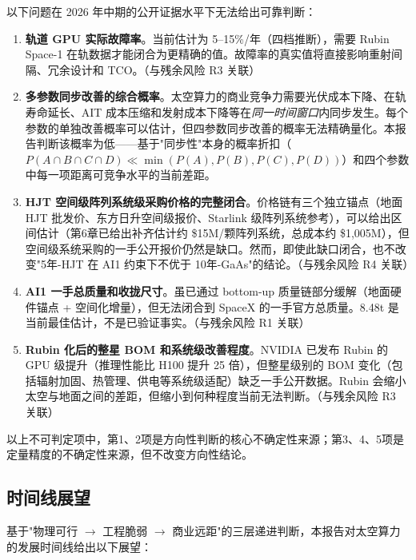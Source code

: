 以下问题在 2026 年中期的公开证据水平下无法给出可靠判断：

\begin{enumerate}[leftmargin=*]
    \item \textbf{轨道 GPU 实际故障率}。当前估计为 5--15\%/年（四档推断），需要 Rubin Space-1 在轨数据才能闭合为更精确的值。故障率的真实值将直接影响重射间隔、冗余设计和 TCO。（与残余风险 R3 关联）

    \item \textbf{多参数同步改善的综合概率}。太空算力的商业竞争力需要光伏成本下降、在轨寿命延长、AIT 成本压缩和发射成本下降等在\emph{同一时间窗口}内同步发生。每个参数的单独改善概率可以估计，但四参数同步改善的概率无法精确量化。本报告判断该概率为低——基于"同步性"本身的概率折扣（$P(A \cap B \cap C \cap D) \ll \min(P(A), P(B), P(C), P(D))$）和四个参数中每一项距离可竞争水平的当前差距。

    \item \textbf{HJT 空间级阵列系统级采购价格的完整闭合}。价格链有三个独立锚点（地面 HJT 批发价、东方日升空间级报价、Starlink 级阵列系统参考），可以给出区间估计（第6章已给出补齐估计约 \$15M/颗阵列系统，总成本约 \$1,005M），但空间级系统采购的一手公开报价仍然是缺口。然而，即使此缺口闭合，也不改变"5年-HJT 在 AI1 约束下不优于 10年-GaAs"的结论。（与残余风险 R4 关联）

    \item \textbf{AI1 一手总质量和收拢尺寸}。虽已通过 bottom-up 质量链部分缓解（地面硬件锚点 + 空间化增量），但无法闭合到 SpaceX 的一手官方总质量。8.48\;t 是当前最佳估计，不是已验证事实。（与残余风险 R1 关联）

    \item \textbf{Rubin 化后的整星 BOM 和系统级改善程度}。NVIDIA 已发布 Rubin 的 GPU 级提升（推理性能比 H100 提升 25 倍），但整星级别的 BOM 变化（包括辐射加固、热管理、供电等系统级适配）缺乏一手公开数据。Rubin 会缩小太空与地面之间的差距，但缩小到何种程度当前无法判断。（与残余风险 R3 关联）
\end{enumerate}

以上不可判定项中，第1、2项是方向性判断的核心不确定性来源；第3、4、5项是定量精度的不确定性来源，但不改变方向性结论。

\subsection{时间线展望}

基于"物理可行 $\to$ 工程脆弱 $\to$ 商业远距"的三层递进判断，本报告对太空算力的发展时间线给出以下展望：

